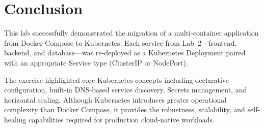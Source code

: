 \documentclass[12pt,a4paper]{article}
\begin{document}
\section{Conclusion}

This lab successfully demonstrated the migration of a multi-container application
from Docker Compose to Kubernetes. Each service from Lab~2---frontend, backend,
and database---was re-deployed as a Kubernetes Deployment paired with an
appropriate Service type (ClusterIP or NodePort).

The exercise highlighted core Kubernetes concepts including declarative
configuration, built-in DNS-based service discovery, Secrets management, and
horizontal scaling. Although Kubernetes introduces greater operational complexity
than Docker Compose, it provides the robustness, scalability, and self-healing
capabilities required for production cloud-native workloads.

\end{document}
